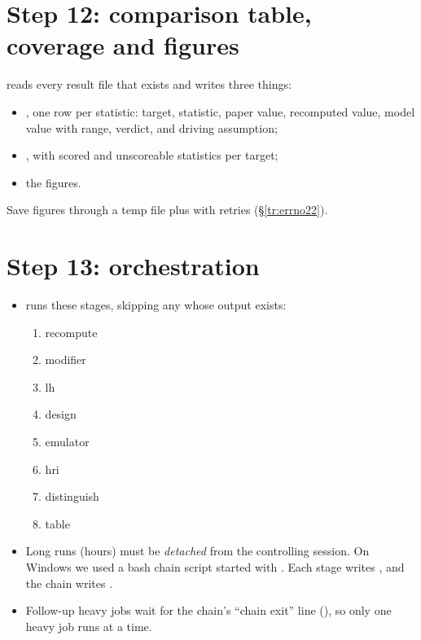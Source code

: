\section{Step 12: comparison table, coverage and figures}
 reads every result file that exists and writes three things:
\begin{itemize}
\item {}, one row per statistic: target, statistic, paper value, recomputed value, model value with range, verdict, and driving assumption;
\item {}, with scored and unscoreable statistics per target;
\item the figures.
\end{itemize}
Save figures through a temp file plus  with retries (\S\ref{tr:errno22}).

\section{Step 13: orchestration}
\begin{itemize}
\item {} runs these stages, skipping any whose output exists:
  \begin{enumerate}
  \item recompute
  \item modifier
  \item lh
  \item design
  \item emulator
  \item hri
  \item distinguish
  \item table
  \end{enumerate}
\item Long runs (hours) must be \emph{detached} from the controlling session. On Windows we used a bash chain script started with . Each stage writes , and the chain writes .
\item Follow-up heavy jobs wait for the chain's ``chain exit'' line (), so only one heavy job runs at a time.
\end{itemize}

